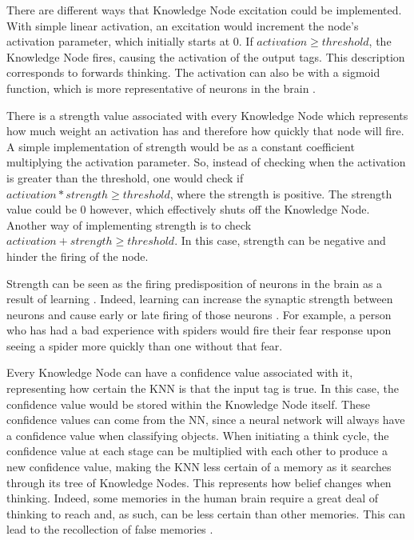 \documentclass[titlepage,11pt]{article}
\begin{document}
There are different ways that Knowledge Node excitation could be implemented. With simple linear activation, an excitation would increment the node's activation parameter, which initially starts at 0. If $activation \geq threshold$, the Knowledge Node fires, causing the activation of the output tags. This description corresponds to forwards thinking. The activation can also be with a sigmoid function, which is more representative of neurons in the brain \cite{neuro}.


There is a strength value associated with every Knowledge Node which represents how much weight an activation has and therefore how quickly that node will fire. A simple implementation of strength would be as a constant coefficient multiplying the activation parameter. So, instead of checking when the activation is greater than the threshold, one would check if $activation * strength \geq threshold$, where the strength is positive. The strength value could be 0 however, which effectively shuts off the Knowledge Node. Another way of implementing strength is to check $activation + strength \geq threshold$. In this case, strength can be negative and hinder the firing of the node.

Strength can be seen as the firing predisposition of neurons in the brain as a result of learning \cite{vybihal-knowledge}. Indeed, learning can increase the synaptic strength between neurons and cause early or late firing of those neurons \cite{hebb}. For example, a person who has had a bad experience with spiders would fire their fear response upon seeing a spider more quickly than one without that fear.

Every Knowledge Node can have a confidence value associated with it, representing how certain the KNN is that the input tag is true. In this case, the confidence value would be stored within the Knowledge Node itself. These confidence values can come from the NN, since a neural network will always have a confidence value when classifying objects. When initiating a think cycle, the confidence value at each stage can be multiplied with each other to produce a new confidence value, making the KNN less certain of a memory as it searches through its tree of Knowledge Nodes. This represents how belief changes when thinking. Indeed, some memories in the human brain require a great deal of thinking to reach and, as such, can be less certain than other memories. This can lead to the recollection of false memories \cite{falsememories}.
\end{document}
